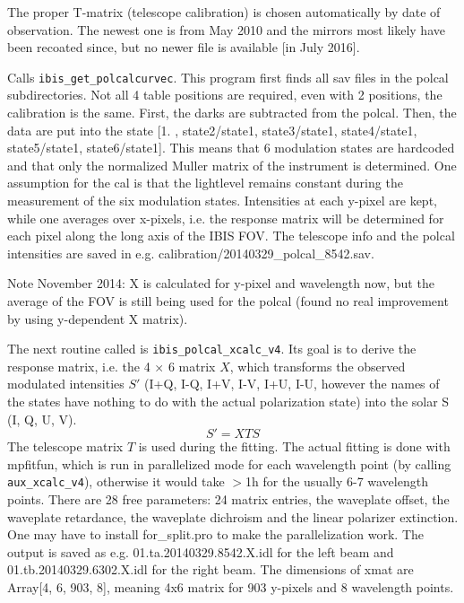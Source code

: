 \documentclass[a4paper,11pt]{article}
\begin{document}
The proper T-matrix (telescope calibration) is chosen automatically by date of observation.  The newest one is from May 2010 and the mirrors most likely have been recoated since, but no newer file is available [in July 2016].

 Calls \texttt{ibis\_get\_polcalcurvec}. This program first finds all sav files in the polcal subdirectories. Not all 4 table positions are required, even with 2 positions, the calibration is the same. First, the darks are subtracted from the polcal. Then, the data are put into the state [1. , state2/state1, state3/state1, state4/state1, state5/state1, state6/state1]. This means that 6 modulation states are hardcoded and that only the normalized Muller matrix of the instrument is determined. One assumption for the cal is that the lightlevel remains constant during the measurement of the six modulation states. Intensities at each y-pixel are kept, while one averages over x-pixels, i.e. the response matrix will be determined for each pixel along the long axis of the IBIS FOV. The telescope info and the polcal intensities are saved in  e.g. calibration/20140329\_polcal\_8542.sav.
 
Note November 2014: X is calculated for y-pixel and wavelength now, but the average of the FOV is still being used for the polcal (found no real improvement by using y-dependent X matrix).

The next routine called is  \texttt{ibis\_polcal\_xcalc\_v4}. Its goal is to derive the response matrix, i.e. the 4 $\times$ 6 matrix $X$, which transforms the observed modulated intensities $S'$ (I+Q, I-Q, I+V, I-V, I+U, I-U, however the names of the states have nothing to do with the actual polarization state) into the solar S (I, Q, U, V). 
\begin{equation}
S' = X T S
\end{equation}
 The telescope matrix $T$ is used during the fitting. The actual fitting is done with mpfitfun, which is run in parallelized mode for each wavelength point (by calling \texttt{aux\_xcalc\_v4}), otherwise it would take $>$1h for the usually 6-7 wavelength points. There are 28 free parameters: 24 matrix entries, the waveplate offset, the waveplate retardance, the waveplate dichroism and the linear polarizer extinction. One may have to install for\_split.pro to make the parallelization work. The output is saved as e.g. 01.ta.20140329.8542.X.idl for the left beam and 01.tb.20140329.6302.X.idl for the right beam. The dimensions of xmat are Array[4, 6, 903, 8], meaning 4x6 matrix for 903 y-pixels and 8 wavelength points.
\end{document}
